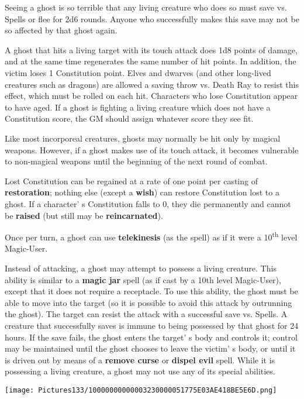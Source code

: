 \documentclass[a4paper,twoside,openany,10pt]{book}
\begin{document}
\begin{multicols}{2}
Seeing a ghost is so terrible that any living creature who does so must save vs. Spells or flee for 2d6 rounds. Anyone who successfully makes this save may not be so affected by that ghost again.

A ghost that hits a living target with its touch attack does 1d8 points of damage, and at the same time regenerates the same number of hit points. In addition, the victim loses 1 Constitution point. Elves and dwarves (and other long-lived creatures such as dragons) are allowed a saving throw vs. Death Ray to resist this effect, which must be rolled on each hit. Characters who lose Constitution appear to have aged. If a ghost is fighting a living creature which does not have a Constitution score, the GM should assign whatever score they see fit. 

Like most incorporeal creatures, ghosts may normally be hit only by magical weapons. However, if a ghost makes use of its touch attack, it becomes vulnerable to non-magical weapons until the beginning of the next round of combat.

Lost Constitution can be regained at a rate of one point per casting of \textbf{restoration}; nothing else (except a \textbf{wish}) can restore Constitution lost to a ghost. If a character' s Constitution falls to 0, they die permanently and cannot be \textbf{raised} (but still may be \textbf{reincarnated}).

Once per turn, a ghost can use \textbf{telekinesis} (as the spell) as if it were a 10\textsuperscript{th} level Magic-User.

Instead of attacking, a ghost may attempt to possess a living creature. This ability is similar to a \textbf{magic jar} spell (as if cast by a 10th level Magic-User), except that it does not require a receptacle. To use this ability, the ghost must be able to move into the target (so it is possible to avoid this attack by outrunning the ghost). The target can resist the attack with a successful save vs. Spells. A creature that successfully saves is immune to being possessed by that ghost for 24 hours. If the save fails, the ghost enters the target' s body and controls it; control may be maintained until the ghost chooses to leave the victim' s body, or until it is driven out by means of a \textbf{remove curse} or \textbf{dispel evil} spell. While it is possessing a living creature, a ghost may not use any of its special abilities.

\begin{center}
	\texttt{[image: Pictures133/10000000000003230000051775E03AE418BE5E6D.png]}
\end{center}




\end{multicols}
\end{document}

